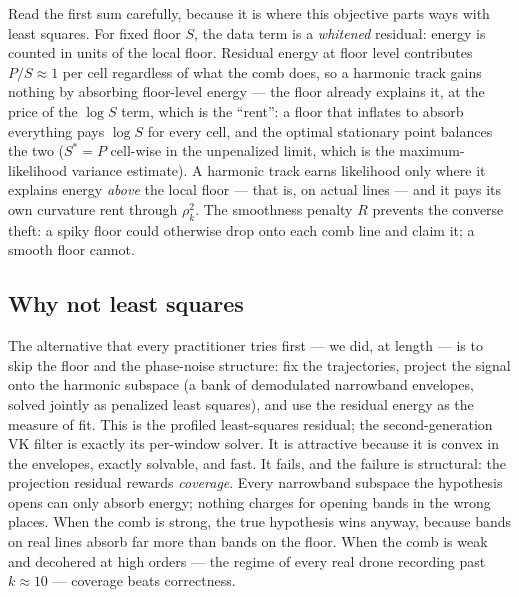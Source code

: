 \documentclass[journal]{IEEEtran}
\begin{document}
Read the first sum carefully, because it is where this objective parts
ways with least squares. For fixed floor $S$, the data term is a
\emph{whitened} residual: energy is counted in units of the local floor.
Residual energy at floor level contributes $P/S \approx 1$ per cell
regardless of what the comb does, so a harmonic track gains nothing by
absorbing floor-level energy --- the floor already explains it, at the
price of the $\log S$ term, which is the ``rent'': a floor that inflates
to absorb everything pays $\log S$ for every cell, and the optimal
stationary point balances the two ($S^\ast = P$ cell-wise in the
unpenalized limit, which is the maximum-likelihood variance estimate).
A harmonic track earns likelihood only where it explains energy
\emph{above} the local floor --- that is, on actual lines --- and it
pays its own curvature rent through $\rho_k^2$. The smoothness penalty
$R$ prevents the converse theft: a spiky floor could otherwise drop onto
each comb line and claim it; a smooth floor cannot.

\subsection{Why not least squares}
\label{sec:whynotls}

The alternative that every practitioner tries first --- we did, at
length --- is to skip the floor and the phase-noise structure: fix the
trajectories, project the signal onto the harmonic subspace (a bank of
demodulated narrowband envelopes, solved jointly as penalized least
squares), and use the residual energy as the measure of fit. This is the
profiled least-squares residual; the second-generation VK filter is
exactly its per-window solver. It is attractive because it is convex in
the envelopes, exactly solvable, and fast. It fails, and the failure is
structural: the projection residual rewards \emph{coverage}. Every
narrowband subspace the hypothesis opens can only absorb energy; nothing
charges for opening bands in the wrong places. When the comb is strong,
the true hypothesis wins anyway, because bands on real lines absorb far
more than bands on the floor. When the comb is weak and decohered at
high orders --- the regime of every real drone recording past
$k \approx 10$ --- coverage beats correctness.
\end{document}

